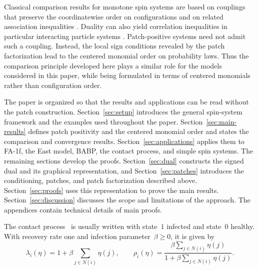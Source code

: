 Classical comparison results for monotone spin systems are based on couplings
that preserve the coordinatewise order on configurations and on related
association inequalities
\cite{Harris1977,Liggett1985,Liggett2006}. Duality can also yield correlation
inequalities in particular interacting particle systems
\cite{GiardinaRedigVafayi2010}. Patch-positive systems need not admit such a
coupling. Instead, the local sign conditions revealed by the patch
factorization lead to the centered monomial order on probability laws. Thus
the comparison principle developed here plays a similar role for the models
considered in this paper, while being formulated in terms of centered
monomials rather than configuration order.

The paper is organized so that the results and applications can be read
without the patch construction. Section~\ref{sec:setup} introduces the general
spin-system framework and the examples used throughout the paper.
Section~\ref{sec:main-results} defines patch positivity and the centered
monomial order and states the comparison and convergence results.
Section~\ref{sec:applications} applies them to FA-1f, the East model, BABP,
the contact process, and simple spin systems. The remaining sections develop
the proofs. Section~\ref{sec:dual} constructs the signed dual and its graphical
representation, and Section~\ref{sec:patches} introduces the conditioning,
patches, and patch factorization described above. Section~\ref{sec:proofs}
uses this representation to prove the main results.
Section~\ref{sec:discussion} discusses the scope and limitations of the
approach. The appendices contain technical details of main proofs.


\begin{example}
The contact process~\cite{Harris1974} is usually written with state~$1$
infected and state~$0$ healthy. With recovery rate one and infection
parameter~$\beta\geq0$, it is given by
\begin{equation*}
\lambda_i(\eta)
=
1+\beta\sum_{j\in N(i)}\eta(j),
\qquad
\rho_i(\eta)
=
\frac{\beta\sum_{j\in N(i)}\eta(j)}{1+\beta\sum_{j\in N(i)}\eta(j)}.
\end{equation*}
\end{example}


